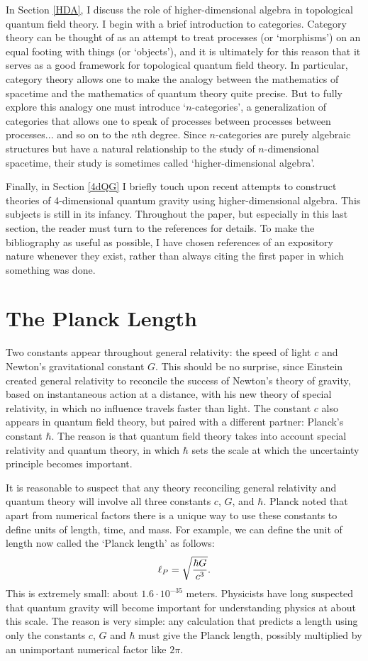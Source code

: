 \documentclass[12pt,amsfonts]{article}
\begin{document}
In Section \ref{HDA}, I discuss the role of higher-dimensional algebra
in topological quantum field theory.  I begin with a brief
introduction to categories.  Category theory can be thought of as
an attempt to treat processes (or `morphisms') on an equal footing with
things (or `objects'), and it is ultimately for this reason that it
serves as a good framework for topological quantum field theory.  In
particular, category theory allows one to make the analogy between the
mathematics of spacetime and the mathematics of quantum theory quite
precise.  But to fully explore this analogy one must introduce
`$n$-categories', a generalization of categories that allows one to
speak of processes between processes between processes... and so on to
the $n$th degree.  Since $n$-categories are purely algebraic structures
but have a natural relationship to the study of $n$-dimensional
spacetime, their study is sometimes called `higher-dimensional algebra'.
 
Finally, in Section \ref{4dQG} I briefly touch upon recent attempts to
construct theories of 4-dimensional quantum gravity using 
higher-dimensional algebra.  This subjects is still in its infancy.
Throughout the paper, but especially  in this last section, the reader
must turn to the references for details.  To make the bibliography as
useful as possible, I have chosen references of an expository nature 
whenever they exist, rather than always citing the first paper in which 
something was done.  

\section{The Planck Length} \label{planck.length}

Two constants appear throughout general relativity: the speed of light
$c$ and Newton's gravitational constant $G$.   This should be no
surprise, since Einstein created general relativity to reconcile the
success of Newton's theory of gravity, based on instantaneous action at
a distance, with his new theory of special relativity, in which no
influence travels faster than light.  The constant $c$ also appears in
quantum field theory, but paired with a different partner: Planck's
constant $\hbar$.   The reason is that quantum field theory takes
into account special relativity and quantum theory, in which $\hbar$ 
sets the scale at which the uncertainty principle becomes important.  

It is reasonable to suspect that any theory reconciling general
relativity and quantum theory will involve all three constants $c$, $G$,
and $\hbar$.  Planck noted that apart from numerical factors there
is a unique way to use these constants to define units of length, time, 
and mass.  For example, we can define the unit of length now
called the `Planck length' as follows:
\[          \ell_P = \sqrt{\hbar G \over c^3}.  \]
This is extremely small: about $1.6 \cdot 10^{-35}$ meters.   Physicists
have long suspected that quantum gravity will become important for
understanding physics at about this scale.   The reason is very simple: any
calculation that predicts a length using only the constants $c$, $G$ and
$\hbar$ must give the Planck length, possibly multiplied by an
unimportant numerical factor like $2\pi$.  
\end{document}
